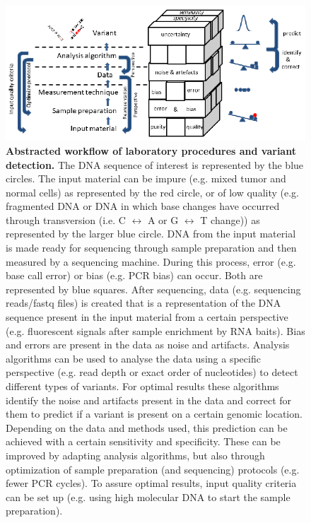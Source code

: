 \begin{figure}
	\includegraphics[width=1.0\linewidth]{img/Chapter11_fig1}
	\caption[Workflow of laboratory procedures and variant detection]{\textbf{Abstracted workflow of laboratory procedures and variant detection.} The DNA sequence of interest is represented by the blue circles. The input material can be impure (e.g. mixed tumor and normal cells) as represented by the red circle, or of low quality (e.g. fragmented DNA or DNA in which base changes have occurred through transversion (i.e. C $\leftrightarrow$ A or G $\leftrightarrow$ T change)) as represented by the larger blue circle. DNA from the input material is made ready for sequencing through sample preparation and then measured by a sequencing machine. During this process, error (e.g. base call error) or bias (e.g. PCR bias) can occur. Both are represented by blue squares. After sequencing, data (e.g. sequencing reads/fastq files) is created that is a representation of the DNA sequence present in the input material from a certain perspective (e.g. fluorescent signals after sample enrichment by RNA baits). Bias and errors are present in the data as noise and artifacts. Analysis algorithms can be used to analyse the data using a specific perspective (e.g. read depth or exact order of nucleotides) to detect different types of variants. For optimal results these algorithms identify the noise and artifacts present in the data and correct for them to predict if a variant is present on a certain genomic location. Depending on the data and methods used, this prediction can be achieved with a certain sensitivity and specificity. These can be improved by adapting analysis algorithms, but also through optimization of sample preparation (and sequencing) protocols (e.g. fewer PCR cycles). To assure optimal results, input quality criteria can be set up (e.g. using high molecular DNA to start the sample preparation).}
	\label{fig:Chapter11_Fig1}
\end{figure}

